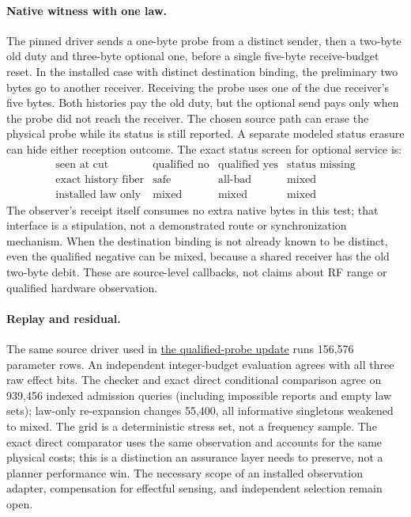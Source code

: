 \documentclass[11pt]{article}
\begin{document}
\paragraph{Native witness with one law.}
The pinned driver sends a one-byte probe from a distinct sender, then a
two-byte old duty and three-byte optional one, before a single five-byte
receive-budget reset. In the installed case with distinct destination
binding, the preliminary two bytes go to another receiver. Receiving the
probe uses one of the due receiver's five bytes. Both histories pay the
old duty, but the optional send pays only when the probe did not reach the
receiver. The chosen source path can erase the physical probe while its
status is still reported. A separate modeled status erasure can hide either
reception outcome. The exact status screen for optional service is:
\[
\begin{array}{c|ccc}
\text{seen at cut} & \text{qualified no} & \text{qualified yes}
                    & \text{status missing}\\\hline
\text{exact history fiber} & \text{safe} & \text{all-bad} & \text{mixed}\\
\text{installed law only} & \text{mixed} & \text{mixed} & \text{mixed}
\end{array}
\]
The observer's receipt itself consumes no extra native bytes in this
test; that interface is a stipulation, not a demonstrated route or
synchronization mechanism. When the destination binding is not already
known to be distinct, even the qualified negative can be mixed, because
a shared receiver has the old two-byte debit. These are source-level
callbacks, not claims about RF range or qualified hardware observation.

\paragraph{Replay and residual.}
The same source driver used in
\href{https://github.com/eternal-november/eos-research-programmes/pull/574}{the
qualified-probe update} runs 156,576 parameter rows. An independent
integer-budget evaluation agrees with all three raw effect bits. The checker
and exact direct conditional comparison agree on 939,456 indexed admission
queries (including impossible reports and empty law sets); law-only
re-expansion changes 55,400, all informative singletons weakened to mixed.
The grid is a deterministic stress set, not a frequency sample. The
exact direct comparator uses the same observation and accounts for the same
physical costs; this is a distinction an assurance layer needs to preserve,
not a planner performance win. The necessary scope of an installed
observation adapter, compensation for effectful sensing, and independent
selection remain open.
\end{document}
